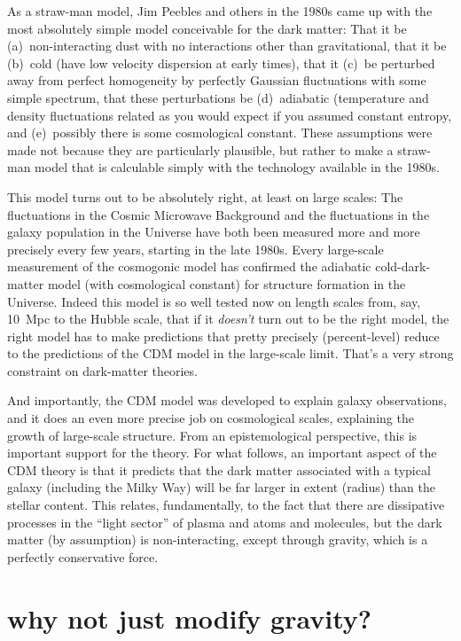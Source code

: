 \documentclass[12pt]{article}
\begin{document}
As a straw-man model, Jim Peebles and others in the 1980s came up with
the most absolutely simple model conceivable for the dark matter: That
it be (a)~non-interacting dust with no interactions other than
gravitational, that it be (b)~cold (have low velocity dispersion at
early times), that it (c)~be perturbed away from perfect homogeneity
by perfectly Gaussian fluctuations with some simple spectrum, that
these perturbations be (d)~adiabatic (temperature and density
fluctuations related as you would expect if you assumed constant
entropy, and (e)~possibly there is some cosmological constant.  These
assumptions were made not because they are particularly plausible, but
rather to make a straw-man model that is calculable simply with the
technology available in the 1980s.

This model turns out to be absolutely right, at least on large scales:
The fluctuations in the Cosmic Microwave Background and the
fluctuations in the galaxy population in the Universe have both been
measured more and more precisely every few years, starting in the late
1980s.  Every large-scale measurement of the cosmogonic model has
confirmed the adiabatic cold-dark-matter model (with cosmological
constant) for structure formation in the Universe.  Indeed this model
is so well tested now on length scales from, say, 10~Mpc to the Hubble
scale, that if it \emph{doesn't} turn out to be the right model, the
right model has to make predictions that pretty precisely
(percent-level) reduce to the predictions of the CDM model in the
large-scale limit.  That's a very strong constraint on dark-matter
theories.

And importantly, the CDM model was developed to explain galaxy
observations, and it does an even more precise job on cosmological
scales, explaining the growth of large-scale structure.  From an
epistemological perspective, this is important support for the theory.
For what follows, an important aspect of the CDM theory is that it
predicts that the dark matter associated with a typical galaxy
(including the Milky Way) will be far larger in extent (radius) than
the stellar content.  This relates, fundamentally, to the fact that
there are dissipative processes in the ``light sector'' of plasma and
atoms and molecules, but the dark matter (by assumption) is
non-interacting, except through gravity, which is a perfectly
conservative force.

\section{why not just modify gravity?}
\end{document}
